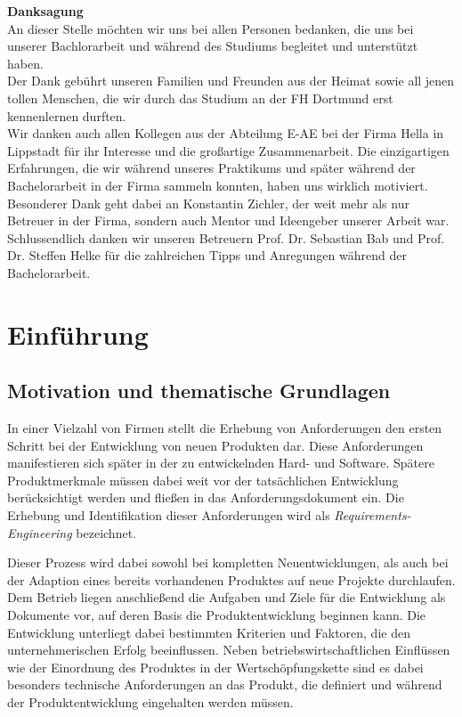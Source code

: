 \documentclass[12pt]{report}
\begin{document}
\thispagestyle{empty}
\textbf{Danksagung}
\vspace{12pt} \\
An dieser Stelle möchten wir uns bei allen Personen bedanken, die uns bei unserer Bachlorarbeit und während des Studiums begleitet und unterstützt haben.
\vspace{12pt} \\
Der Dank gebührt unseren Familien und Freunden aus der Heimat sowie all jenen tollen Menschen, die wir durch das Studium an der FH Dortmund erst kennenlernen durften.
\vspace{12pt} \\
Wir danken auch allen Kollegen aus der Abteilung E-AE bei der Firma Hella in Lippstadt für ihr Interesse und die großartige Zusammenarbeit. Die einzigartigen Erfahrungen, die wir während unseres Praktikums und später während der Bachelorarbeit in der Firma sammeln konnten, haben uns wirklich motiviert. Besonderer Dank geht dabei an Konstantin Zichler, der weit mehr als nur Betreuer in der Firma, sondern auch Mentor und Ideengeber unserer Arbeit war.
\vspace{12pt} \\
Schlussendlich danken wir unseren Betreuern Prof. Dr. Sebastian Bab und Prof. Dr. Steffen Helke für die zahlreichen Tipps und Anregungen während der Bachelorarbeit.

\newpage

\newpage
\chapter{Einführung}
\section[Motivation]{Motivation und thematische Grundlagen}
In einer Vielzahl von Firmen stellt die Erhebung von Anforderungen den ersten Schritt bei der Entwicklung von neuen Produkten dar. Diese Anforderungen manifestieren sich später in der zu entwickelnden Hard- und Software. Spätere Produktmerkmale müssen dabei weit vor der tatsächlichen Entwicklung berücksichtigt werden und fließen in das Anforderungsdokument ein. Die Erhebung und Identifikation dieser Anforderungen wird als \textit{Requirements-Engineering} bezeichnet.

Dieser Prozess wird dabei sowohl bei kompletten Neuentwicklungen, als auch bei der Adaption eines bereits vorhandenen Produktes auf neue Projekte durchlaufen. Dem Betrieb liegen anschließend die Aufgaben und Ziele für die Entwicklung als Dokumente vor, auf deren Basis die Produktentwicklung beginnen kann.  Die Entwicklung unterliegt dabei bestimmten Kriterien und Faktoren, die den unternehmerischen Erfolg beeinflussen. Neben betriebswirtschaftlichen Einflüssen wie der Einordnung des Produktes in der Wertschöpfungskette sind es dabei besonders technische Anforderungen an das Produkt, die definiert und während der Produktentwicklung eingehalten werden müssen. 
\end{document}
